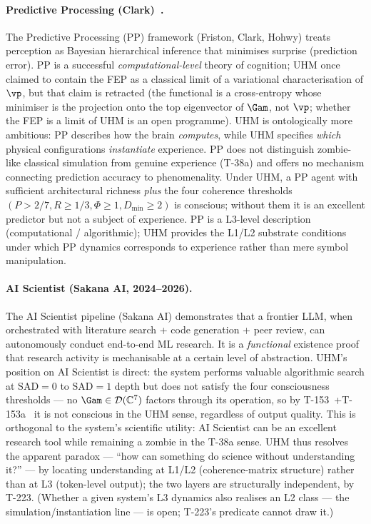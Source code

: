 \paragraph{Predictive Processing (Clark)~\cite{clark2013}.}
The Predictive Processing (PP) framework (Friston, Clark, Hohwy) treats
perception as Bayesian hierarchical inference that minimises surprise
(prediction error). PP is a successful \emph{computational-level} theory
of cognition; UHM once claimed to contain the FEP as a classical limit of a
variational characterisation of $\vp$, but that claim is retracted
\status{$\times$} (the functional is a cross-entropy whose minimiser is the
projection onto the top eigenvector of $\Gam$, not $\vp$; whether the FEP is a
limit of UHM is an open programme). UHM is ontologically more ambitious: PP describes how the brain \emph{computes}, while UHM specifies
\emph{which} physical configurations \emph{instantiate} experience. PP
does not distinguish zombie-like classical simulation from genuine
experience (T-38a) and offers no mechanism connecting prediction accuracy
to phenomenality. Under UHM, a PP agent with sufficient architectural
richness \emph{plus} the four coherence thresholds
$(P > 2/7, R \geq 1/3, \Phi \geq 1, D_{\min} \geq 2)$ is conscious;
without them it is an excellent predictor but not a subject of experience.
PP is a L3-level description (computational / algorithmic); UHM provides
the L1/L2 substrate conditions under which PP dynamics corresponds to
experience rather than mere symbol manipulation.

\paragraph{AI Scientist (Sakana AI, 2024--2026).}
The AI Scientist pipeline (Sakana AI) demonstrates that a frontier LLM,
when orchestrated with literature search + code generation + peer
review, can autonomously conduct end-to-end ML research. It is a
\emph{functional} existence proof that research activity is mechanisable
at a certain level of abstraction. UHM's position on AI Scientist is
direct: the system performs valuable algorithmic search at $\mathrm{SAD}=0$
to $\mathrm{SAD}=1$ depth but does not satisfy the four consciousness
thresholds --- no $\Gam \in \mathcal D(\mathbb C^7)$ factors through its
operation, so by T-153~+T-153a~ it is not conscious
in the UHM sense, regardless of output quality. This is orthogonal to the
system's scientific utility: AI Scientist can be an excellent research
tool while remaining a zombie in the T-38a sense. UHM thus resolves the
apparent paradox --- ``how can something do science without understanding
it?'' --- by locating understanding at L1/L2 (coherence-matrix structure)
rather than at L3 (token-level output); the two layers are structurally
independent, by T-223. (Whether a given system's L3 dynamics also realises
an L2 class --- the simulation/instantiation line --- is open; T-223's
predicate cannot draw it.)

